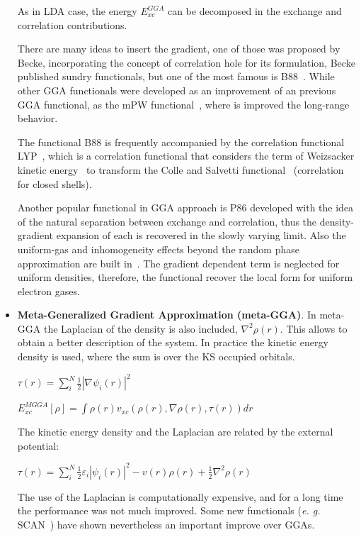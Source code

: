 \begin{itemize}
As in LDA case, the energy $E_{xc}^{GGA}$ can be decomposed in the exchange
and correlation contributions.

There are many ideas to insert the gradient, one of those was proposed by
Becke, incorporating the concept of correlation hole for its formulation, Becke
published sundry functionals, but one of the most famous is
B88~\cite{Becke1988}. While other GGA functionals were developed as an
improvement of an previous GGA functional, as the mPW
functional~\cite{Adamo1998}, where is improved the long-range behavior.

The functional B88 is frequently accompanied by the correlation functional
LYP~\cite{Lee1988}, which is a correlation functional that considers the term
of Weizsacker kinetic energy~\cite{weizsacker1935theorie} to transform the
Colle and Salvetti functional~\cite{Colle1975} (correlation for closed shells).

Another popular functional in GGA approach is P86 developed with the idea of
the natural separation between exchange and correlation, thus the
density-gradient expansion of each is recovered in the slowly varying limit. Also
the uniform-gas and inhomogeneity effects beyond the random phase
approximation are built in~\cite{Perdew1986}. The gradient dependent term
is neglected for uniform densities, therefore, the functional recover the local form
for uniform electron gases.


\item \textbf{Meta-Generalized Gradient Approximation (meta-GGA)}.
In meta-GGA the
Laplacian of the density is also included, $\nabla^{2}\rho (r)$. This allows to
obtain a better description of the system.  In practice the kinetic energy
density is used, where the sum is over the \gls{KS} occupied orbitals.

$\tau (r) = \displaystyle\sum_{i}^{N} \displaystyle\frac12 |\nabla\psi_i (r)|^{2}$

$E_{xc}^{MGGA} [\rho] =\int\rho (r) v_{xc}(\rho (r), \nabla\rho (r), \tau (r)) dr$

The kinetic energy density and the Laplacian are related by the external potential:

$\tau (r) = \displaystyle\sum_{i}^{N} \displaystyle\frac12 \varepsilon_i |\psi_i (r)|^{2}
- v(r)\rho(r) + \displaystyle\frac12 \nabla^2\rho(r)$

The use of the Laplacian is computationally expensive, and for a long time
the performance was not much improved. Some new functionals (\textit{e. g.}
SCAN~\cite{scan}) have shown nevertheless an important improve over GGAs.


\end{itemize}
